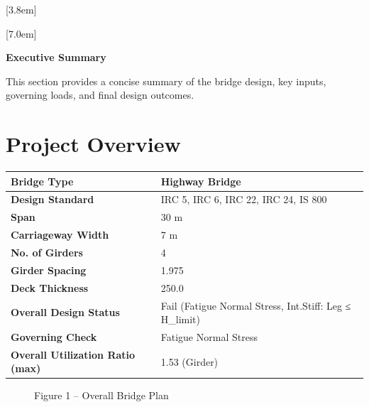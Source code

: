 \documentclass[12pt,a4paper]{report}
\numberwithin{table}{chapter}
\numberwithin{figure}{chapter}
\begin{document}
[3.8em]
  {\normalfont}
  {\contentslabel{2.3em}}
  {\hspace*{-2.3em}}
  {\hfill\contentspage}

[7.0em]
  {\normalfont}
  {\contentslabel{3.2em}}
  {\hspace*{-3.2em}}
  {\hfill\contentspage}

\newpage
\renewcommand{\contentsname}{\centering\Large\bfseries Table of Contents}
\tableofcontents


\newpage
{\centering\Large\bfseries Executive Summary\par}
\vspace{0.8em}

This section provides a concise summary of the bridge design, key inputs, governing loads, and final design outcomes.

\section*{Project Overview}
\label{sec:project-overview}


\begin{tabular}{|L{5.5cm}|L{8.5cm}|}
\hline
\textbf{Bridge Type} & Highway Bridge \\
\hline
\textbf{Design Standard} & IRC 5, IRC 6, IRC 22, IRC 24, IS 800 \\
\hline
\textbf{Span} & 30 m \\
\hline
\textbf{Carriageway Width} & 7 m \\
\hline
\textbf{No. of Girders} & 4 \\
\hline
\textbf{Girder Spacing} & 1.975 \\
\hline
\textbf{Deck Thickness} & 250.0 \\
\hline
\textbf{Overall Design Status} & Fail (Fatigue Normal Stress, Int.Stiff:\allowbreak{} Leg ≤ H\_\allowbreak{}limit) \\
\hline
\textbf{Governing Check} & Fatigue Normal Stress \\
\hline
\textbf{Overall Utilization Ratio (max)} & 1.53 (Girder) \\
\hline
\end{tabular}


\begin{figure}[H]
\centering
{}
\caption*{Figure 1 -- Overall Bridge Plan}
\end{figure}
\end{document}

